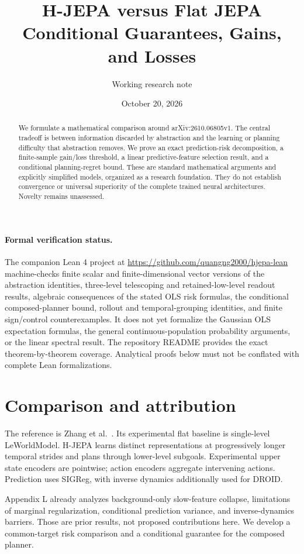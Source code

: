 \documentclass[11pt]{article}
\title{H-JEPA versus Flat JEPA\\Conditional Guarantees, Gains, and Losses}
\author{Working research note}
\date{October 20, 2026}
\begin{document}
\maketitle
\begin{abstract}
We formulate a mathematical comparison around arXiv:2610.06805v1. The central tradeoff is between information discarded by abstraction and the learning or planning difficulty that abstraction removes. We prove an exact prediction-risk decomposition, a finite-sample gain/loss threshold, a linear predictive-feature selection result, and a conditional planning-regret bound. These are standard mathematical arguments and explicitly simplified models, organized as a research foundation. They do not establish convergence or universal superiority of the complete trained neural architectures. Novelty remains unassessed.
\end{abstract}

\paragraph{Formal verification status.}
The companion Lean 4 project at
\url{https://github.com/quangng2000/hjepa-lean} machine-checks finite scalar
and finite-dimensional vector versions of the abstraction identities,
three-level telescoping and retained-low-level readout results,
algebraic consequences of the
stated OLS risk formulas, the conditional composed-planner bound, rollout
and temporal-grouping identities, and finite sign/control counterexamples.
It does not yet formalize the Gaussian OLS expectation formulas, the
general continuous-population probability arguments, or the linear spectral result.
The repository README provides the exact theorem-by-theorem coverage.
Analytical proofs below must not be conflated with complete Lean formalizations.

\section{Comparison and attribution}
The reference is Zhang et al.~\cite{hjepa}. Its experimental flat baseline is single-level LeWorldModel. H-JEPA learns distinct representations at progressively longer temporal strides and plans through lower-level subgoals. Experimental upper state encoders are pointwise; action encoders aggregate intervening actions. Prediction uses SIGReg, with inverse dynamics additionally used for DROID.

Appendix L already analyzes background-only slow-feature collapse, limitations of marginal regularization, conditional prediction variance, and inverse-dynamics barriers. Those are prior results, not proposed contributions here. We develop a common-target risk comparison and a conditional guarantee for the composed planner.
\end{document}
